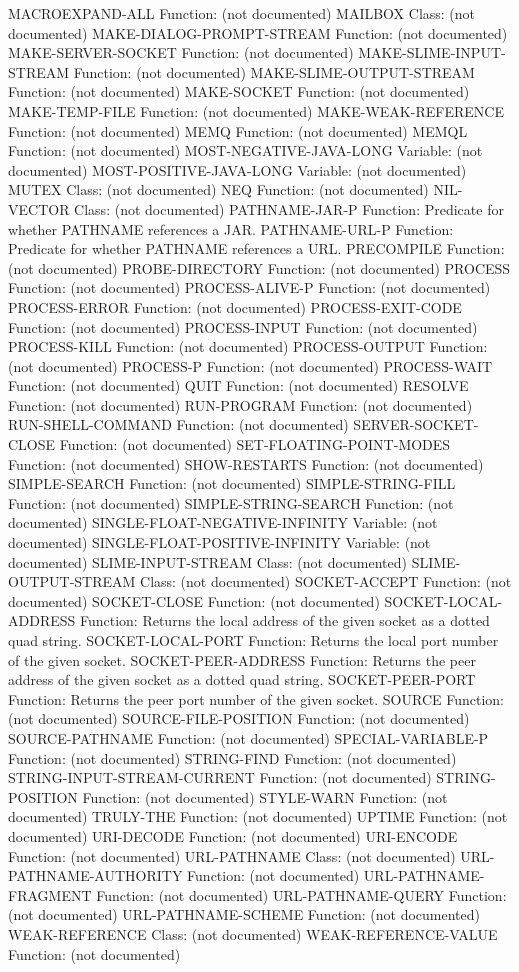 MACROEXPAND-ALL
  Function: (not documented)
MAILBOX
  Class: (not documented)
MAKE-DIALOG-PROMPT-STREAM
  Function: (not documented)
MAKE-SERVER-SOCKET
  Function: (not documented)
MAKE-SLIME-INPUT-STREAM
  Function: (not documented)
MAKE-SLIME-OUTPUT-STREAM
  Function: (not documented)
MAKE-SOCKET
  Function: (not documented)
MAKE-TEMP-FILE
  Function: (not documented)
MAKE-WEAK-REFERENCE
  Function: (not documented)
MEMQ
  Function: (not documented)
MEMQL
  Function: (not documented)
MOST-NEGATIVE-JAVA-LONG
  Variable: (not documented)
MOST-POSITIVE-JAVA-LONG
  Variable: (not documented)
MUTEX
  Class: (not documented)
NEQ
  Function: (not documented)
NIL-VECTOR
  Class: (not documented)
PATHNAME-JAR-P
  Function: Predicate for whether PATHNAME references a JAR.
PATHNAME-URL-P
  Function: Predicate for whether PATHNAME references a URL.
PRECOMPILE
  Function: (not documented)
PROBE-DIRECTORY
  Function: (not documented)
PROCESS
  Function: (not documented)
PROCESS-ALIVE-P
  Function: (not documented)
PROCESS-ERROR
  Function: (not documented)
PROCESS-EXIT-CODE
  Function: (not documented)
PROCESS-INPUT
  Function: (not documented)
PROCESS-KILL
  Function: (not documented)
PROCESS-OUTPUT
  Function: (not documented)
PROCESS-P
  Function: (not documented)
PROCESS-WAIT
  Function: (not documented)
QUIT
  Function: (not documented)
RESOLVE
  Function: (not documented)
RUN-PROGRAM
  Function: (not documented)
RUN-SHELL-COMMAND
  Function: (not documented)
SERVER-SOCKET-CLOSE
  Function: (not documented)
SET-FLOATING-POINT-MODES
  Function: (not documented)
SHOW-RESTARTS
  Function: (not documented)
SIMPLE-SEARCH
  Function: (not documented)
SIMPLE-STRING-FILL
  Function: (not documented)
SIMPLE-STRING-SEARCH
  Function: (not documented)
SINGLE-FLOAT-NEGATIVE-INFINITY
  Variable: (not documented)
SINGLE-FLOAT-POSITIVE-INFINITY
  Variable: (not documented)
SLIME-INPUT-STREAM
  Class: (not documented)
SLIME-OUTPUT-STREAM
  Class: (not documented)
SOCKET-ACCEPT
  Function: (not documented)
SOCKET-CLOSE
  Function: (not documented)
SOCKET-LOCAL-ADDRESS
  Function: Returns the local address of the given socket as a dotted quad string.
SOCKET-LOCAL-PORT
  Function: Returns the local port number of the given socket.
SOCKET-PEER-ADDRESS
  Function: Returns the peer address of the given socket as a dotted quad string.
SOCKET-PEER-PORT
  Function: Returns the peer port number of the given socket.
SOURCE
  Function: (not documented)
SOURCE-FILE-POSITION
  Function: (not documented)
SOURCE-PATHNAME
  Function: (not documented)
SPECIAL-VARIABLE-P
  Function: (not documented)
STRING-FIND
  Function: (not documented)
STRING-INPUT-STREAM-CURRENT
  Function: (not documented)
STRING-POSITION
  Function: (not documented)
STYLE-WARN
  Function: (not documented)
TRULY-THE
  Function: (not documented)
UPTIME
  Function: (not documented)
URI-DECODE
  Function: (not documented)
URI-ENCODE
  Function: (not documented)
URL-PATHNAME
  Class: (not documented)
URL-PATHNAME-AUTHORITY
  Function: (not documented)
URL-PATHNAME-FRAGMENT
  Function: (not documented)
URL-PATHNAME-QUERY
  Function: (not documented)
URL-PATHNAME-SCHEME
  Function: (not documented)
WEAK-REFERENCE
  Class: (not documented)
WEAK-REFERENCE-VALUE
  Function: (not documented)
